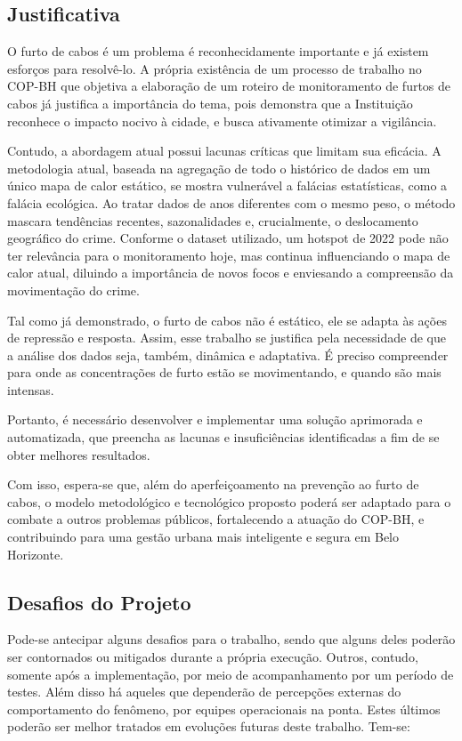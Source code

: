\subsection{Justificativa}

O furto de cabos é um problema é reconhecidamente importante e já existem esforços para resolvê-lo. A própria existência de um processo de trabalho no COP-BH que objetiva a elaboração de um roteiro de monitoramento de furtos de cabos já justifica a importância do tema, pois demonstra que a Instituição reconhece o impacto nocivo à cidade, e busca ativamente otimizar a vigilância. 

Contudo, a abordagem atual possui lacunas críticas que limitam sua eficácia. A metodologia atual, baseada na agregação de todo o histórico de dados em um único mapa de calor estático, se mostra vulnerável a falácias estatísticas, como a falácia ecológica. Ao tratar dados de anos diferentes com o mesmo peso, o método mascara tendências recentes, sazonalidades e, crucialmente, o deslocamento geográfico do crime. Conforme o dataset utilizado, um hotspot de 2022 pode não ter relevância para o monitoramento hoje, mas continua influenciando o mapa de calor atual, diluindo a importância de novos focos e enviesando a compreensão da movimentação do crime.

Tal como já demonstrado, o furto de cabos não é estático, ele se adapta às ações de repressão e resposta. Assim, esse trabalho se justifica pela necessidade de que a análise dos dados seja, também, dinâmica e adaptativa. É preciso compreender para onde as concentrações de furto estão se movimentando, e quando são mais intensas.

Portanto, é necessário desenvolver e implementar uma solução aprimorada e automatizada, que preencha as lacunas e insuficiências identificadas a fim de se obter melhores resultados. 

Com isso, espera-se que, além do aperfeiçoamento na prevenção ao furto de cabos, o modelo metodológico e tecnológico proposto poderá ser adaptado para o combate a outros problemas públicos, fortalecendo a atuação do COP-BH, e contribuindo para uma gestão urbana mais inteligente e segura em Belo Horizonte.

\subsection{Desafios do Projeto}

Pode-se antecipar alguns desafios para o trabalho, sendo que alguns deles poderão ser contornados ou mitigados durante a própria execução. Outros, contudo, somente após a implementação, por meio de acompanhamento por um período de testes. Além disso há aqueles que dependerão de percepções externas do comportamento do fenômeno, por equipes operacionais na ponta. Estes últimos poderão ser melhor tratados em evoluções futuras deste trabalho. Tem-se:

